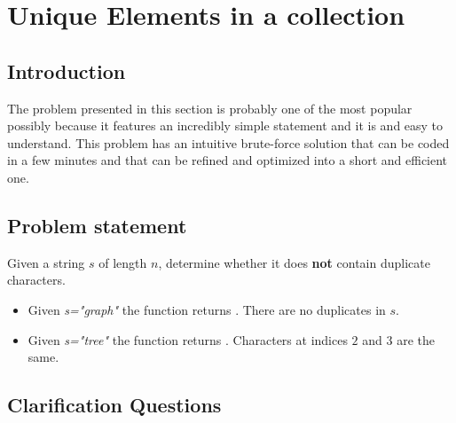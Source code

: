 %


\chapter{Unique Elements in a collection}
\label{ch:unique_elements}
\section*{Introduction}
The problem presented in this section is probably one of the most popular
possibly because it features an incredibly simple statement and it is and easy to understand.
This problem has an intuitive brute-force solution that can be coded in a few minutes and that
can be refined and optimized into a short and efficient one. 

\section{Problem statement}
Given a string $s$ of length $n$, determine whether it does \textbf{not} contain duplicate characters. 

\begin{example}
\hfill
	\begin{itemize}
		\item Given \textit{s="graph"} the function returns . There are no duplicates  in $s$.
		\item Given \textit{s="tree"} the function returns . Characters at indices $2$ and $3$  are the same.
	\end{itemize}
\end{example}

\section{Clarification Questions}

